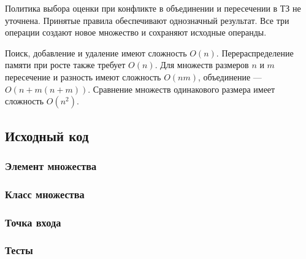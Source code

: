 Политика выбора оценки при конфликте в объединении и пересечении в ТЗ не уточнена. Принятые правила обеспечивают однозначный результат. Все три операции создают новое множество и сохраняют исходные операнды.

Поиск, добавление и удаление имеют сложность $O(n)$. Перераспределение памяти при росте также требует $O(n)$. Для множеств размеров $n$ и $m$ пересечение и разность имеют сложность $O(nm)$, объединение --- $O(n+m(n+m))$. Сравнение множеств одинакового размера имеет сложность $O(n^2)$.

\subsection{Исходный код}

\subsubsection{Элемент множества}



\subsubsection{Класс множества}



\subsubsection{Точка входа}


\subsubsection{Тесты}


